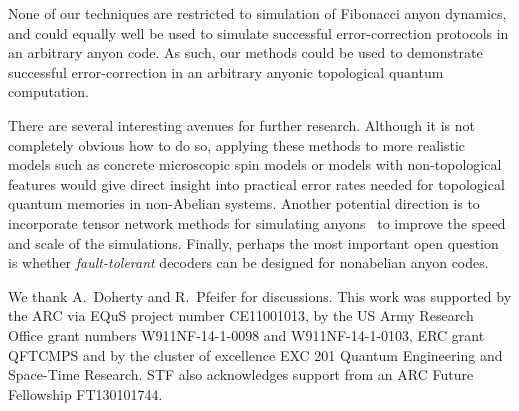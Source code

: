 \documentclass[aps, prl, letterpaper, twocolumn, superscriptaddress, notitlepage, 10pt]{revtex4-1}
\begin{document}
None of our techniques are restricted to simulation of Fibonacci anyon dynamics, and could 
equally well be used to simulate successful error-correction protocols in an arbitrary anyon 
code. 
As such, our methods could be used to demonstrate successful error-correction in an arbitrary anyonic topological quantum computation.

There are several interesting avenues for further research. 
Although it is not completely obvious how to do so, applying these methods to more realistic models such as concrete microscopic spin models or models with non-topological features would give direct insight into practical error rates needed for topological quantum memories in non-Abelian systems. 
Another potential direction is to incorporate tensor network methods for simulating anyons~\cite{Pfeifer2012, Singh2014} to improve the speed and scale of the simulations. 
Finally, perhaps the most important open question is whether \emph{fault-tolerant} decoders can be designed for nonabelian anyon codes. 


\acknowledgments 

We thank A.\ Doherty and R.\ Pfeifer for discussions. 
This work was supported by the ARC via EQuS project number CE11001013, by the US Army Research Office grant numbers W911NF-14-1-0098 and W911NF-14-1-0103, ERC grant QFTCMPS and by the cluster of excellence EXC 201 Quantum Engineering and Space-Time Research. STF also acknowledges support from an ARC Future Fellowship FT130101744.


\end{document}
